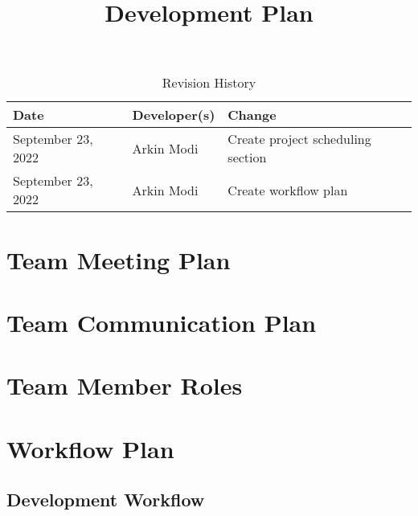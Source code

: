 \documentclass{article}
\title{Development Plan\\\progname}
\author{\authname}
\date{}
\begin{document}
\begin{table}[hp]
  \caption{Revision History} \label{TblRevisionHistory}
  \begin{tabularx}{\textwidth}{llX}
    \toprule
    \textbf{Date}      & \textbf{Developer(s)} & \textbf{Change}                   \\
    \midrule
    September 23, 2022 & Arkin Modi            & Create project scheduling section \\
    September 23, 2022 & Arkin Modi            & Create workflow plan              \\
    \bottomrule
  \end{tabularx}
\end{table}

\newpage

\maketitle


\section{Team Meeting Plan}

\section{Team Communication Plan}

\section{Team Member Roles}

\section{Workflow Plan}


\subsection{Development Workflow}
\end{document}
